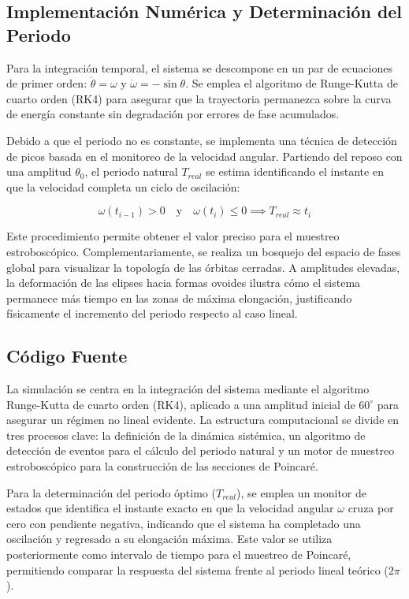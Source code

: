 \subsection{Implementación Numérica y Determinación del Periodo}

Para la integración temporal, el sistema se descompone en un par de ecuaciones de primer orden: $\dot{\theta} = \omega$ y $\dot{\omega} = -\sin\theta$. Se emplea el algoritmo de Runge-Kutta de cuarto orden (RK4) para asegurar que la trayectoria permanezca sobre la curva de energía constante sin degradación por errores de fase acumulados.

Debido a que el periodo no es constante, se implementa una técnica de detección de picos basada en el monitoreo de la velocidad angular. Partiendo del reposo con una amplitud $\theta_0$, el periodo natural $T_{real}$ se estima identificando el instante en que la velocidad completa un ciclo de oscilación:

\begin{equation}
    \omega(t_{i-1}) > 0 \quad \text{y} \quad \omega(t_i) \leq 0 \implies T_{real} \approx t_i
\end{equation}

Este procedimiento permite obtener el valor preciso para el muestreo estroboscópico. Complementariamente, se realiza un bosquejo del espacio de fases global para visualizar la topología de las órbitas cerradas. A amplitudes elevadas, la deformación de las elipses hacia formas ovoides ilustra cómo el sistema permanece más tiempo en las zonas de máxima elongación, justificando físicamente el incremento del periodo respecto al caso lineal.

\subsection{Código Fuente}

La simulación se centra en la integración del sistema mediante el algoritmo Runge-Kutta de cuarto orden (RK4), aplicado a una amplitud inicial de $60^\circ$ para asegurar un régimen no lineal evidente. La estructura computacional se divide en tres procesos clave: la definición de la dinámica sistémica, un algoritmo de detección de eventos para el cálculo del periodo natural y un motor de muestreo estroboscópico para la construcción de las secciones de Poincaré.

Para la determinación del periodo óptimo ($T_{real}$), se emplea un monitor de estados que identifica el instante exacto en que la velocidad angular $\omega$ cruza por cero con pendiente negativa, indicando que el sistema ha completado una oscilación y regresado a su elongación máxima. Este valor se utiliza posteriormente como intervalo de tiempo para el muestreo de Poincaré, permitiendo comparar la respuesta del sistema frente al periodo lineal teórico ($2\pi$).

